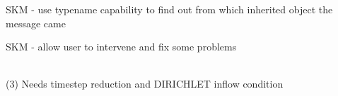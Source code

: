 \begin{DoxyRefList}
\label{todo__todo000004}%
%
SKM -\/ use typename capability to find out from which inherited object the message came

\label{todo__todo000005}%
%
SKM -\/ allow user to intervene and fix some problems 
\item[Member \doxylink{classcsmp_1_1_explicit_node_centered_finite_volume_transport_aaa43a3cab635d167d0def4ef11b522d6}{csmp\+::Explicit\+Node\+Centered\+Finite\+Volume\+Transport\texorpdfstring{$<$}{<} dim, STP \texorpdfstring{$>$}{>}\+::Advect\+Variable} (double time\+\_\+interval, double cfl\+\_\+multiplication\+\_\+factor, bool apply\+\_\+flux\+\_\+balance\+\_\+correction, bool update\+\_\+pore\+\_\+volumes)]\hfill \\
\label{todo__todo000045}%
%
(3) Needs timestep reduction and DIRICHLET inflow condition 


\end{DoxyRefList}
